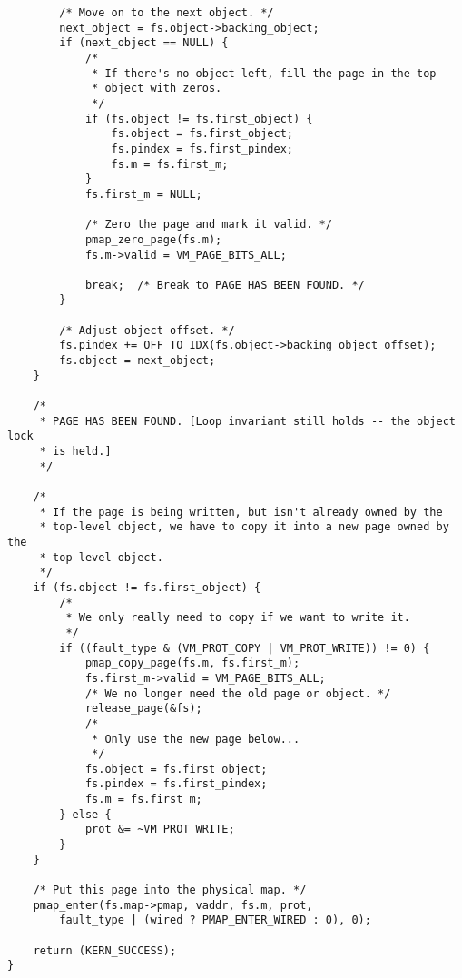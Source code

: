 \documentclass[shortabstract, english]{iithesis}
\newenvironment{code}{}{}
\begin{document}
\begin{code}
\begin{verbatim}
        /* Move on to the next object. */
        next_object = fs.object->backing_object;
        if (next_object == NULL) {
            /*
             * If there's no object left, fill the page in the top
             * object with zeros.
             */
            if (fs.object != fs.first_object) {
                fs.object = fs.first_object;
                fs.pindex = fs.first_pindex;
                fs.m = fs.first_m;
            }
            fs.first_m = NULL;

            /* Zero the page and mark it valid. */
            pmap_zero_page(fs.m);
            fs.m->valid = VM_PAGE_BITS_ALL;

            break;  /* Break to PAGE HAS BEEN FOUND. */
        }

        /* Adjust object offset. */
        fs.pindex += OFF_TO_IDX(fs.object->backing_object_offset);
        fs.object = next_object;
    }

    /*
     * PAGE HAS BEEN FOUND. [Loop invariant still holds -- the object lock
     * is held.]
     */

    /*
     * If the page is being written, but isn't already owned by the
     * top-level object, we have to copy it into a new page owned by the
     * top-level object.
     */
    if (fs.object != fs.first_object) {
        /*
         * We only really need to copy if we want to write it.
         */
        if ((fault_type & (VM_PROT_COPY | VM_PROT_WRITE)) != 0) {
            pmap_copy_page(fs.m, fs.first_m);
            fs.first_m->valid = VM_PAGE_BITS_ALL;
            /* We no longer need the old page or object. */
            release_page(&fs);
            /*
             * Only use the new page below...
             */
            fs.object = fs.first_object;
            fs.pindex = fs.first_pindex;
            fs.m = fs.first_m;
        } else {
            prot &= ~VM_PROT_WRITE;
        }
    }

    /* Put this page into the physical map. */
    pmap_enter(fs.map->pmap, vaddr, fs.m, prot,
        fault_type | (wired ? PMAP_ENTER_WIRED : 0), 0);

    return (KERN_SUCCESS);
}
\end{verbatim}
\end{code}
\end{document}
